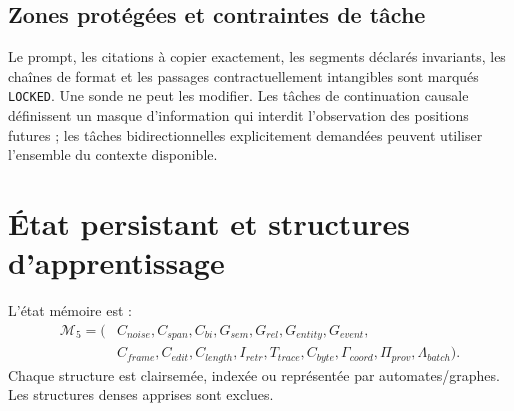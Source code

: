 \documentclass[11pt,a4paper,oneside]{report}
\newcommand{\Mem}{\mathcal{M}}
\begin{document}
\section{Zones protégées et contraintes de tâche}
Le prompt, les citations à copier exactement, les segments déclarés invariants, les chaînes de format et les passages contractuellement intangibles sont marqués \texttt{LOCKED}. Une sonde ne peut les modifier. Les tâches de continuation causale définissent un masque d'information qui interdit l'observation des positions futures ; les tâches bidirectionnelles explicitement demandées peuvent utiliser l'ensemble du contexte disponible.

\chapter{État persistant et structures d'apprentissage}
L'état mémoire est :
\[
\begin{aligned}
\Mem_5=(&C_{noise},C_{span},C_{bi},G_{sem},G_{rel},G_{entity},G_{event},\\
&C_{frame},C_{edit},C_{length},I_{retr},T_{trace},C_{byte},\Gamma_{coord},\Pi_{prov},\Lambda_{batch}).
\end{aligned}
\]
Chaque structure est clairsemée, indexée ou représentée par automates/graphes. Les structures denses apprises sont exclues.
\end{document}

